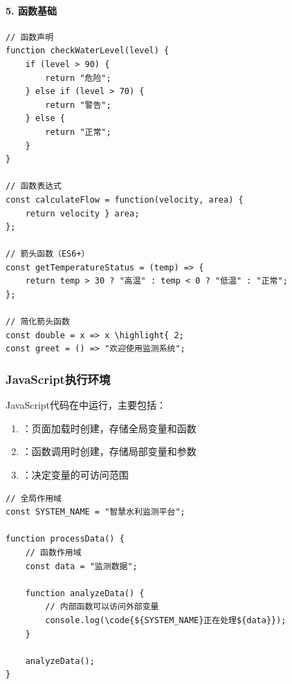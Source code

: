 \hypertarget{ux51fdux6570ux57faux7840}{%
\paragraph{5. 函数基础}\label{ux51fdux6570ux57faux7840}}

\begin{lstlisting}[style=javascript]
// 函数声明
function checkWaterLevel(level) {
    if (level > 90) {
        return "危险";
    } else if (level > 70) {
        return "警告";
    } else {
        return "正常";
    }
}

// 函数表达式
const calculateFlow = function(velocity, area) {
    return velocity } area;
};

// 箭头函数（ES6+）
const getTemperatureStatus = (temp) => {
    return temp > 30 ? "高温" : temp < 0 ? "低温" : "正常";
};

// 简化箭头函数
const double = x => x \highlight{ 2;
const greet = () => "欢迎使用监测系统";
\end{lstlisting}

\hypertarget{javascriptux6267ux884cux73afux5883}{%
\subsubsection{JavaScript执行环境}\label{javascriptux6267ux884cux73afux5883}}

JavaScript代码在中运行，主要包括：

\begin{enumerate}
\def\labelenumi{\arabic{enumi}.}
\tightlist
\item
  ：页面加载时创建，存储全局变量和函数
\item
  ：函数调用时创建，存储局部变量和参数
\item
  ：决定变量的可访问范围
\end{enumerate}

\begin{lstlisting}[style=javascript]
// 全局作用域
const SYSTEM_NAME = "智慧水利监测平台";

function processData() {
    // 函数作用域
    const data = "监测数据";
    
    function analyzeData() {
        // 内部函数可以访问外部变量
        console.log(\code{${SYSTEM_NAME}正在处理${data}});
    }
    
    analyzeData();
}
\end{lstlisting}


